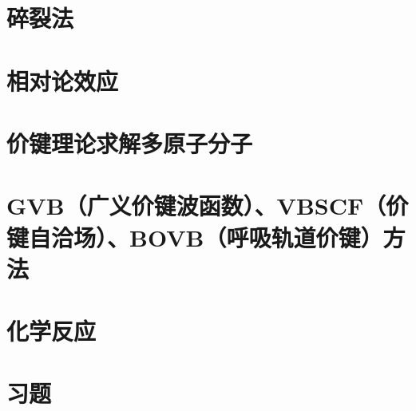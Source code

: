 \section{碎裂法}
\label{sec:16.10 Fragmentation Methods}

\section{相对论效应}
\label{sec:16.11 Relativistic Effects}

\section{价键理论求解多原子分子}
\label{sec:16.12 Valence Bond Treatmen of Polyatomic Molecules}

\section{GVB（广义价键波函数）、VBSCF（价键自洽场）、BOVB（呼吸轨道价键）方法}
\label{sec:16.13 The GVB, VBSCF, and BOVB methods}

\section{化学反应}
\label{sec:16.14 Chemical Reactions}

\section*{习题}
